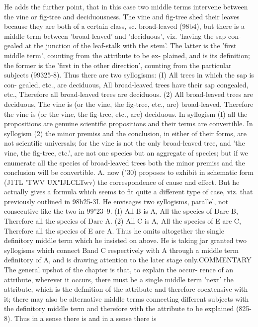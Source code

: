 {{{{{{{{{{{{{{{{{{{{{{{{{{{{{{{{{{{{{{{{{{{{{{{{{{{{{{{{{{{{{{{{{{{{{{{{He adds the further point, that in this case two middle terms
intervene between the vine or fig-tree and deciduousness. The
vine and fig-tree shed their leaves because they are both of a
certain class, sc. broad-leaved (98b4), but there is a middle term
between 'broad-leaved' and 'deciduous', viz. 'having the sap con-
gealed at the junction of the leaf-stalk with the stem'. The latter
is the 'first middle term', counting from the attribute to be ex-
plained, and is its definition; the former is the 'first in the other
direction', counting from the particular subjects (99325-8). Thus
there are two syllogisms: (I) All trees in which the sap is con-
gealed, etc., are deciduous, All broad-leaved trees have their sap
congealed, etc., Therefore all broad-leaved trees are deciduous. (2)
All broad-leaved trees are deciduous, The vine is (or the vine,
the fig-tree, etc., are) broad-leaved, Therefore the vine is (or
the vine, the fig-tree, etc., are) deciduous. In syllogism (I) all
the propositions are genuine scientific propositions and their
terms are convertible. In syllogism (2) the minor premiss and the
conclusion, in either of their forms, are not scientific universals;
for the vine is not the only broad-leaved tree, and 'the vine, the
fig-tree, etc.', are not one species but an aggregate of species;
but if we enumerate all the species of broad-leaved trees both
the minor premiss and the conclusion will be convertible.
A. now ("30) proposes to exhibit in schematic form (J1TL 'TWV
UX"IJLCLTwv) the correspondence of cause and effect. But he
actually gives a formula which seems to fit quite a different type
of case, viz. that previously outlined in 98b25-3I. He envisages
two syllogisms, parallel, not consecutive like the two in 99"23--9.
(I) All B is A, All the species of Dare B, Therefore all the species
of Dare A. (2) All C is A, All the species of E are C, Therefore
all the species of E are A. Thus he omits altogether the single
definitory middle term which he insisted on above. He is taking
jar granted two syllogisms which connect Band C respectively
with A through a middle term definitory of A, and is drawing
attention to the later stage only.COMMENTARY
The general upshot of the chapter is that, to explain the occur-
rence of an attribute, wherever it occurs, there must be a single
middle term 'next' the attribute, which is the defmition of the
attribute and therefore coextensive with it; there may also be
alternative middle terms connecting different subjects with the
definitory middle term and therefore with the attribute to be
explained (825-8). Thus in a sense there is and in a sense there is
}}}}}}}}}}}}}}}}}}}}}}}}}}}}}}}}}}}}}}}}}}}}}}}}}}}}}}}}}}}}}}}}}}}}}}}}
